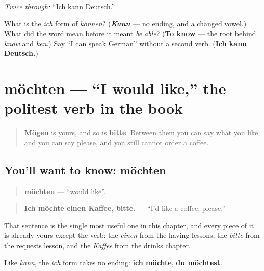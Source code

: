 \emph{Twice through:} \textquotedblleft{}Ich kann Deutsch.\textquotedblright{}

\begin{tcolorbox}[breakable,colback=teal!4,colframe=teal!35!black,title={Before you move on}]
What is the \emph{ich} form of \emph{können}? (\emph{\textbf{Kann}} — no ending, and a changed vowel.) What did the word mean before it meant \emph{be able}? (\textbf{To know} — the root behind \emph{know} and \emph{ken}.) Say \textquotedblleft{}I can speak German\textquotedblright{} without a second verb. (\textbf{Ich kann Deutsch.})
\end{tcolorbox}
\section[möchten]{möchten — \textquotedblleft{}I would like,\textquotedblright{} the politest verb in the book}

\label{lesson:GE-C38-moechten}



\begin{quote}
\textbf{Mögen} is yours, and so is \textbf{bitte}. Between them you can say what you like and you can say please, and you still cannot order a coffee.
\end{quote}

\subsection*{You'll want to know: möchten}
\begin{quote}
\textbf{möchten} — \textquotedblleft{}would like\textquotedblright{}.
\end{quote}

\begin{quote}
\textbf{Ich möchte einen Kaffee, bitte.} — \textquotedblleft{}I'd like a coffee, please.\textquotedblright{}
\end{quote}

That sentence is the single most useful one in this chapter, and every piece of it is already yours except the verb: the \emph{einen} from the having lessons, the \emph{bitte} from the requests lesson, and the \emph{Kaffee} from the drinks chapter.

Like \emph{kann}, the \emph{ich} form takes no ending: \textbf{ich möchte}, \textbf{du möchtest}.

